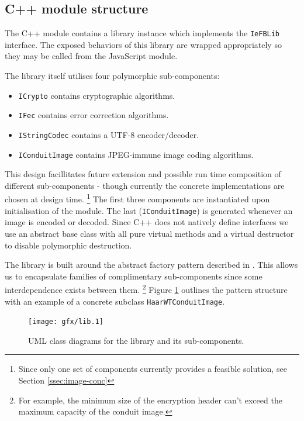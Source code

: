 \subsection{C++ module structure}

    The C++ module contains a library instance which implements the {\tt IeFBLib} interface. The exposed behaviors of this library are wrapped appropriately so they may be called from the JavaScript module.
    
    The library itself utilises four polymorphic sub-components:
    
    \begin{itemize}
    
        \item {\tt ICrypto} contains cryptographic algorithms.
        \item {\tt IFec} contains error correction algorithms.
        \item {\tt IStringCodec} contains a UTF-8 encoder/decoder.
        \item {\tt IConduitImage} contains JPEG-immune image coding algorithms.
    
    \end{itemize}
    
    This design facillitates future extension and possible run time composition of different sub-components - though currently the concrete implementations are chosen at design time. \footnote{Since only one set of components currently provides a feasible solution, see Section \ref{ssec:image-conc}} The first three components are instantiated upon initialisation of the module. The last ({\tt IConduitImage}) is generated whenever an image is encoded or decoded. Since C++ does not natively define interfaces we use an abstract base class with all pure virtual methods and a virtual destructor to disable polymorphic destruction.
    
    The library is built around the abstract factory pattern described in \cite{dpatterns}. This allows us to encapsulate families of complimentary sub-components since some interdependence exists between them. \footnote{For example, the minimum size of the encryption header can't exceed the maximum capacity of the conduit image.} Figure \ref{uml:lib-classes} outlines the pattern structure with an example of a concrete subclass {\tt HaarWTConduitImage}.
    
    \begin{figure}[tb]
        \begin{center}
                \texttt{[image: gfx/lib.1]}
            \caption{UML class diagrams for the library and its sub-components.}
            \label{uml:lib-classes}
        \end{center}
    \end{figure}
    
